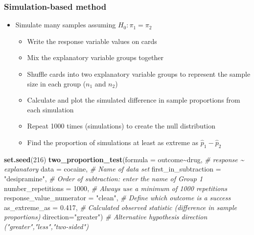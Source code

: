 \documentclass[
]{report}
\newenvironment{Shaded}{\begin{snugshade}}{\end{snugshade}}
\newcommand{\AttributeTok}[1]{\textcolor[rgb]{0.13,0.29,0.53}{#1}}
\newcommand{\CommentTok}[1]{\textcolor[rgb]{0.56,0.35,0.01}{\textit{#1}}}
\newcommand{\DecValTok}[1]{\textcolor[rgb]{0.00,0.00,0.81}{#1}}
\newcommand{\FloatTok}[1]{\textcolor[rgb]{0.00,0.00,0.81}{#1}}
\newcommand{\FunctionTok}[1]{\textcolor[rgb]{0.13,0.29,0.53}{\textbf{#1}}}
\newcommand{\NormalTok}[1]{#1}
\newcommand{\SpecialCharTok}[1]{\textcolor[rgb]{0.81,0.36,0.00}{\textbf{#1}}}
\newcommand{\StringTok}[1]{\textcolor[rgb]{0.31,0.60,0.02}{#1}}
\begin{document}
\subsubsection*{Simulation-based method}\label{simulation-based-method-2}

\begin{itemize}
\item
  Simulate many samples assuming \(H_0: \pi_1 = \pi_2\)

  \begin{itemize}
  \item
    Write the response variable values on cards
  \item
    Mix the explanatory variable groups together
  \item
    Shuffle cards into two explanatory variable groups to represent the sample size in each group (\(n_1\) and \(n_2\))
  \item
    Calculate and plot the simulated difference in sample proportions from each simulation
  \item
    Repeat 1000 times (simulations) to create the null distribution
  \item
    Find the proportion of simulations at least as extreme as \(\hat{p}_1 - \hat{p}_2\)
  \end{itemize}
\end{itemize}

\begin{Shaded}
\begin{Highlighting}[]
\FunctionTok{set.seed}\NormalTok{(}\DecValTok{216}\NormalTok{)}
\FunctionTok{two\_proportion\_test}\NormalTok{(}\AttributeTok{formula =}\NormalTok{ outcome}\SpecialCharTok{\textasciitilde{}}\NormalTok{drug, }\CommentTok{\# response \textasciitilde{} explanatory}
    \AttributeTok{data =}\NormalTok{ cocaine, }\CommentTok{\# Name of data set}
    \AttributeTok{first\_in\_subtraction =} \StringTok{"desipramine"}\NormalTok{, }\CommentTok{\# Order of subtraction: enter the name of Group 1}
    \AttributeTok{number\_repetitions =} \DecValTok{1000}\NormalTok{, }\CommentTok{\# Always use a minimum of 1000 repetitions}
    \AttributeTok{response\_value\_numerator =} \StringTok{"clean"}\NormalTok{, }\CommentTok{\# Define which outcome is a success}
    \AttributeTok{as\_extreme\_as =} \FloatTok{0.417}\NormalTok{, }\CommentTok{\# Calculated observed statistic (difference in sample proportions)}
    \AttributeTok{direction=}\StringTok{"greater"}\NormalTok{) }\CommentTok{\# Alternative hypothesis direction ("greater","less","two{-}sided")}
\end{Highlighting}
\end{Shaded}
\end{document}
